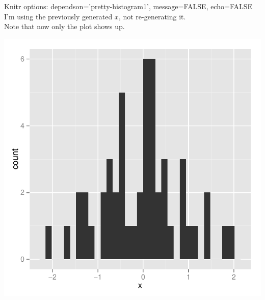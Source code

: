 \documentclass{article}\usepackage[]{graphicx}\usepackage[]{color}
\newenvironment{knitrout}{}{} %
\begin{document}
\clearpage
\noindent Knitr options: dependson='pretty-histogram1', message=FALSE, echo=FALSE\\
I'm using the previously generated $x$, not re-generating it.\\
Note that now only the plot shows up.
\begin{knitrout}
\color{fgcolor}

{\centering \includegraphics[width=\textwidth]{figure/pretty-histogram4} 

}



\end{knitrout}


\clearpage
\end{document}
